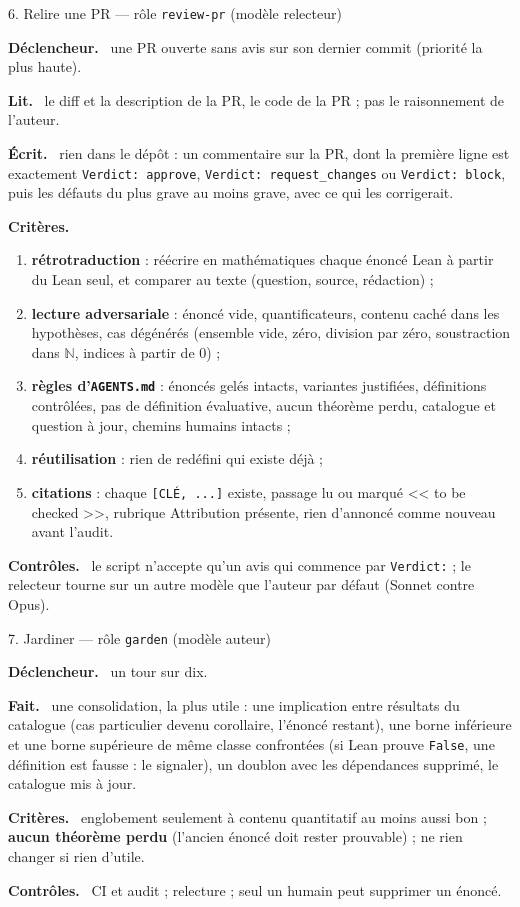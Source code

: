 \documentclass[11pt,a4paper]{article}
\newcommand{\cmd}[1]{\texttt{#1}}
\newcommand{\rub}[1]{\par\smallskip\textsf{\textbf{#1.}}~}
\begin{document}
\begin{tache}{6. Relire une PR --- rôle \cmd{review-pr} (modèle relecteur)}
\rub{Déclencheur} une PR ouverte sans avis sur son dernier commit (priorité la plus haute).
\rub{Lit} le diff et la description de la PR, le code de la PR ; pas le raisonnement de l'auteur.
\rub{Écrit} rien dans le dépôt : un commentaire sur la PR, dont la première ligne est exactement
\cmd{Verdict: approve}, \cmd{Verdict: request\_changes} ou \cmd{Verdict: block}, puis les défauts du plus
grave au moins grave, avec ce qui les corrigerait.
\rub{Critères}
\begin{enumerate}
\item \textbf{rétrotraduction} : réécrire en mathématiques chaque énoncé Lean à partir du Lean seul, et
  comparer au texte (question, source, rédaction) ;
\item \textbf{lecture adversariale} : énoncé vide, quantificateurs, contenu caché dans les hypothèses,
  cas dégénérés (ensemble vide, zéro, division par zéro, soustraction dans $\mathbb N$, indices à partir
  de 0) ;
\item \textbf{règles d'\cmd{AGENTS.md}} : énoncés gelés intacts, variantes justifiées, définitions
  contrôlées, pas de définition évaluative, aucun théorème perdu, catalogue et question à jour, chemins
  humains intacts ;
\item \textbf{réutilisation} : rien de redéfini qui existe déjà ;
\item \textbf{citations} : chaque \cmd{[CLÉ, ...]} existe, passage lu ou marqué << to be checked >>,
  rubrique Attribution présente, rien d'annoncé comme nouveau avant l'audit.
\end{enumerate}
\rub{Contrôles} le script n'accepte qu'un avis qui commence par \cmd{Verdict:} ; le relecteur tourne sur
un autre modèle que l'auteur par défaut (Sonnet contre Opus).
\end{tache}

\begin{tache}{7. Jardiner --- rôle \cmd{garden} (modèle auteur)}
\rub{Déclencheur} un tour sur dix.
\rub{Fait} une consolidation, la plus utile : une implication entre résultats du catalogue (cas
particulier devenu corollaire, l'énoncé restant), une borne inférieure et une borne supérieure de même
classe confrontées (si Lean prouve \cmd{False}, une définition est fausse : le signaler), un doublon avec
les dépendances supprimé, le catalogue mis à jour.
\rub{Critères} englobement seulement à contenu quantitatif au moins aussi bon ; \textbf{aucun théorème
perdu} (l'ancien énoncé doit rester prouvable) ; ne rien changer si rien d'utile.
\rub{Contrôles} CI et audit ; relecture ; seul un humain peut supprimer un énoncé.
\end{tache}
\end{document}
